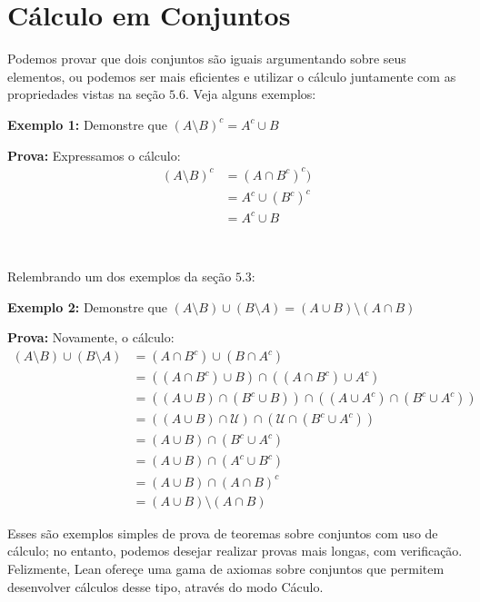 \section{Cálculo em Conjuntos}
Podemos provar que dois conjuntos são iguais argumentando sobre seus elementos, ou podemos ser mais eficientes e utilizar o cálculo juntamente com as propriedades vistas na seção $5.6$. Veja alguns exemplos:

  \textbf{Exemplo 1:} Demonstre que $(A \setminus B)^c = A^c \cup B$

  \textbf{Prova:} Expressamos o cálculo:
  \begin{equation*}
    \begin{aligned}
      (A \setminus B)^c &= (A \cap B^c)^c)\\
      &= A^c \cup (B^c)^c\\
      & = A^c \cup B
    \end{aligned}
  \end{equation*}

  $\qquad$

  Relembrando um dos exemplos da seção $5.3$:

  \textbf{Exemplo 2:} Demonstre que $(A \setminus B) \cup (B \setminus A) = (A \cup B) \setminus (A \cap B)$

  \textbf{Prova:} Novamente, o cálculo:
  \begin{equation*}
    \begin{aligned}
      (A \setminus B) \cup (B \setminus A) &= (A \cap B^c) \cup (B \cap A^c)\\
      &= ((A \cap B^c) \cup B) \cap ((A \cap B^c) \cup A^c)\\
      &= ((A \cup B) \cap (B^c \cup B)) \cap ((A \cup A^c) \cap (B^c \cup A^c))\\
      &= ((A \cup B) \cap \mathcal U) \cap (\mathcal U \cap (B^c \cup A^c))\\
      &= (A \cup B) \cap (B^c \cup A^c)\\
      &= (A \cup B) \cap (A^c \cup B^c)\\
      &= (A \cup B) \cap (A \cap B)^c\\
      &= (A \cup B) \setminus (A \cap B)
    \end{aligned}
  \end{equation*}

Esses são exemplos simples de prova de teoremas sobre conjuntos com uso de cálculo; no entanto, podemos desejar realizar provas mais longas, com verificação. Felizmente, Lean ofereçe uma gama de axiomas sobre conjuntos que permitem desenvolver cálculos desse tipo, através do modo Cáculo.


